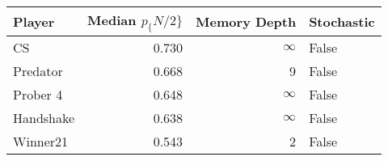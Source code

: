 \begin{tabular}{lrrl}
\toprule
    Player &  Median $p_\{N/2\}$ &  Memory Depth & Stochastic \\
\midrule
        CS &             0.730 &            \(\infty\) &      False \\
  Predator &             0.668 &             9 &      False \\
  Prober 4 &             0.648 &            \(\infty\) &      False \\
 Handshake &             0.638 &            \(\infty\) &      False \\
  Winner21 &             0.543 &             2 &      False \\
\bottomrule
\end{tabular}
